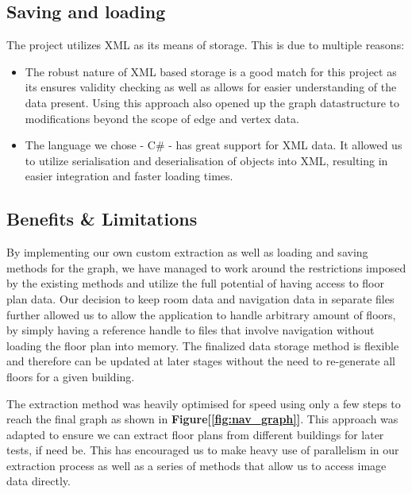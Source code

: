 \documentclass[main.tex]{subfiles}
\begin{document}
\subsection{Saving and loading}
The project utilizes XML as its means of storage. This is due to multiple reasons:
	
\begin{itemize}

\item The robust nature of XML based storage is a good match for this project as its ensures validity checking as well as allows for easier understanding of the data present. Using this approach also opened up the graph datastructure to modifications beyond the scope of edge and vertex data. 
		
\item The language we chose - C\# - has great support for XML data. It allowed us to utilize serialisation and deserialisation of objects into XML, resulting in easier integration and faster loading times.
\end{itemize}

\subsection{Benefits \& Limitations}
By implementing our own custom extraction as well as loading and saving methods for the graph, we have managed to work around the restrictions imposed by the existing methods and utilize the full potential of having access to floor plan data. Our decision to keep room data and navigation data in separate files further allowed us to allow the application to handle arbitrary amount of floors, by simply having a reference handle to files that involve navigation without loading the floor plan into memory. The finalized data storage method is flexible and therefore can be updated at later stages without the need to re-generate all floors for a given building.
\newline

The extraction method was heavily optimised for speed using only a few steps to reach the final graph as shown in \textbf{Figure[\ref{fig:nav_graph}]}. This approach was adapted to ensure we can extract floor plans from different buildings for later tests, if need be. This has encouraged us to make heavy use of parallelism in our extraction process as well as a series of methods that allow us to access image data directly. 
\newline
\end{document}
